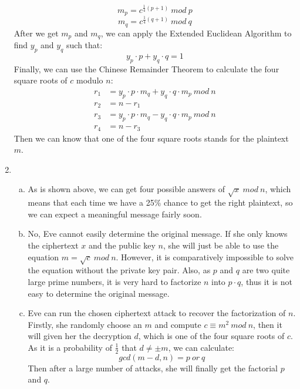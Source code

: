 \documentclass[12pt, a4paper]{article}
\begin{document}
\begin{enumerate}
          $$m_p = c^{\frac{1}{4}(p+1)}\ mod\ p$$
          $$m_q = c^{\frac{1}{4}(q+1)}\ mod\ q$$
          After we get $m_p$ and $m_q$, we can apply the Extended Euclidean Algorithm to find $y_p$ and $y_q$ such that:\newline
          $$y_p\cdot p + y_q\cdot q = 1$$
          Finally, we can use the Chinese Remainder Theorem to calculate the four square roots of $c$ modulo $n$:
          \begin{align*}
            r_1 &= y_p\cdot p\cdot m_q + y_q\cdot q\cdot m_p\ mod\ n\\
            r_2 &= n - r_1\\
            r_3 &= y_p\cdot p\cdot m_q - y_q\cdot q\cdot m_p\ mod\ n\\
            r_4 &= n - r_3
          \end{align*}
          Then we can know that one of the four square roots stands for the plaintext $m$.
    \item \begin{enumerate}[a)]
            \item As is shown above, we can get four possible answers of $\sqrt{x}\ mod\ n$, which means that 
                  each time we have a 25\% chance to get the right plaintext, so we can expect a meaningful 
                  message fairly soon.
            \item No, Eve cannot easily determine the original message. If she only knows the ciphertext $x$ and 
                  the public key $n$, she will just be able to use the equation $m = \sqrt{c}\ mod\ n$. However, 
                  it is comparatively impossible to solve the equation without the private key pair. Also, 
                  as $p$ and $q$ are two quite large prime numbers, it is very hard to factorize $n$ into $p\cdot q$, 
                  thus it is not easy to determine the original message.
            \item Eve can run the chosen ciphertext attack to recover the factorization of $n$.\newline
                  Firstly, she randomly choose an $m$ and compute $c \equiv m^2\ mod\ n$, 
                  then it will given her the decryption $d$, which is one of the four square roots of $c$.
                  As it is a probability of $\frac{1}{2}$ that $d \neq \pm m$, we can calculate:
                  $$gcd(m-d, n) = p\ or\ q$$
                  Then after a large number of attacks, she will finally get the factorial $p$ and $q$.
    \end{enumerate}
          
\end{enumerate}
\end{document}
